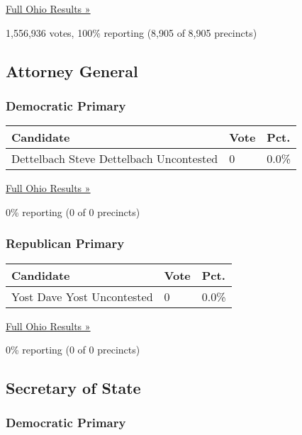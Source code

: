 \href{https://www.nytimes3xbfgragh.onion/elections/results/ohio}{Full
Ohio Results »}

1,556,936 votes, 100\% reporting (8,905 of 8,905 precincts)

\hypertarget{attorney-general}{%
\subsection{Attorney General}\label{attorney-general}}

\hypertarget{democratic-primary-18}{%
\subsubsection{Democratic Primary}\label{democratic-primary-18}}

\begin{longtable}[]{@{}lll@{}}
\toprule
Candidate & Vote & Pct.\tabularnewline
\midrule
\endhead
 Dettelbach Steve Dettelbach Uncontested & 0 & 0.0\%\tabularnewline
\bottomrule
\end{longtable}

\href{https://www.nytimes3xbfgragh.onion/elections/results/ohio}{Full
Ohio Results »}

0\% reporting (0 of 0 precincts)

\hypertarget{republican-primary-18}{%
\subsubsection{Republican Primary}\label{republican-primary-18}}

\begin{longtable}[]{@{}lll@{}}
\toprule
Candidate & Vote & Pct.\tabularnewline
\midrule
\endhead
 Yost Dave Yost Uncontested & 0 & 0.0\%\tabularnewline
\bottomrule
\end{longtable}

\href{https://www.nytimes3xbfgragh.onion/elections/results/ohio}{Full
Ohio Results »}

0\% reporting (0 of 0 precincts)

\hypertarget{secretary-of-state}{%
\subsection{Secretary of State}\label{secretary-of-state}}

\hypertarget{democratic-primary-19}{%
\subsubsection{Democratic Primary}\label{democratic-primary-19}}

